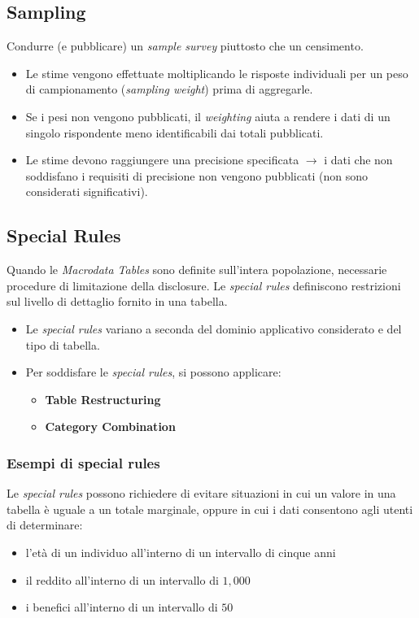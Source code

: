 \documentclass{report}
\begin{document}
\subsection{Sampling}
Condurre (e pubblicare) un \textit{sample survey} piuttosto che un censimento.
\begin{itemize}
    \item Le stime vengono effettuate moltiplicando le risposte individuali per un peso di campionamento (\textit{sampling weight}) prima di aggregarle.
    \item Se i pesi non vengono pubblicati, il \textit{weighting} aiuta a rendere i dati di un singolo rispondente meno identificabili dai totali pubblicati.
    \item Le stime devono raggiungere una precisione specificata $\rightarrow$ i dati che non soddisfano i requisiti di precisione non vengono pubblicati (non sono considerati significativi).
\end{itemize}


\subsection{Special Rules}
Quando le \textit{Macrodata Tables} sono definite sull'intera popolazione, necessarie procedure di limitazione della disclosure. 
Le \textit{special rules} definiscono restrizioni sul livello di dettaglio fornito in una tabella.
\begin{itemize}
    \item Le \textit{special rules} variano a seconda del dominio applicativo considerato e del tipo di tabella.
    \item Per soddisfare le \textit{special rules}, si possono applicare:
    \begin{itemize}
        \item \textbf{Table Restructuring}
        \item \textbf{Category Combination}
    \end{itemize}
\end{itemize}

\subsubsection{Esempi di special rules}
Le \textit{special rules} possono richiedere di evitare situazioni in cui un valore in una tabella è uguale a un totale marginale, oppure in cui i dati consentono agli utenti di determinare:

\begin{itemize}
    \item l'età di un individuo all'interno di un intervallo di cinque anni
    \item il reddito all'interno di un intervallo di $1,000$
    \item i benefici all'interno di un intervallo di $50$
\end{itemize}
\end{document}
